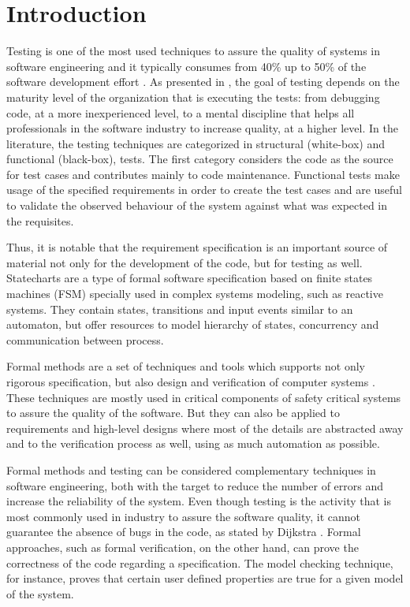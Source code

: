 \chapter{Introduction}
\label{cap:introducao}

Testing is one of the most used techniques to assure the quality of systems in software engineering and it typically consumes from 40\% up to 50\% of the software development effort \cite{Luo}. As presented in \cite{Ammann:08}, the goal of testing depends on the maturity level of the organization that is executing the tests: from debugging code, at a more inexperienced level, to a mental discipline that helps all professionals in the software industry to increase quality, at a higher level. In the literature, the testing techniques are categorized in structural (white-box) and functional (black-box), tests. The first category considers the code as the source for test cases and contributes mainly to code maintenance. Functional tests make usage of the specified requirements in order to create the test cases and are useful to validate the observed behaviour of the system against what was expected in the requisites.

Thus, it is notable that the requirement specification is an important source of material not only for the development of the code, but for testing as well. Statecharts are a type of formal software specification based on finite states machines (FSM) specially used in complex systems modeling, such as reactive systems\cite{harel87:semantics_statecharts}. They contain states, transitions and input events similar to an automaton, but offer resources to model hierarchy of states, concurrency and communication between process.


Formal methods are a set of techniques and tools which supports not only rigorous specification, but also design and verification of computer systems \cite{FMEurope}. These techniques are mostly used in critical components of safety critical systems to assure the quality of the software. But they can also be applied to requirements and high-level designs where most of the details are abstracted away and to the verification process as well, using as much automation as possible\cite{NASAlangley}.


Formal methods and testing can be considered complementary techniques in software engineering, both with the target to reduce the number of errors and increase the reliability of the system\cite{fortest}. Even though testing is the activity that is most commonly used in industry to assure the software quality, it cannot guarantee the absence of bugs in the code, as stated by Dijkstra \cite{dijkstra}. Formal approaches, such as formal verification, on the other hand, can prove the correctness of the code regarding a specification. The model checking technique, for instance, proves that certain user defined properties are true for a given model of the system.


